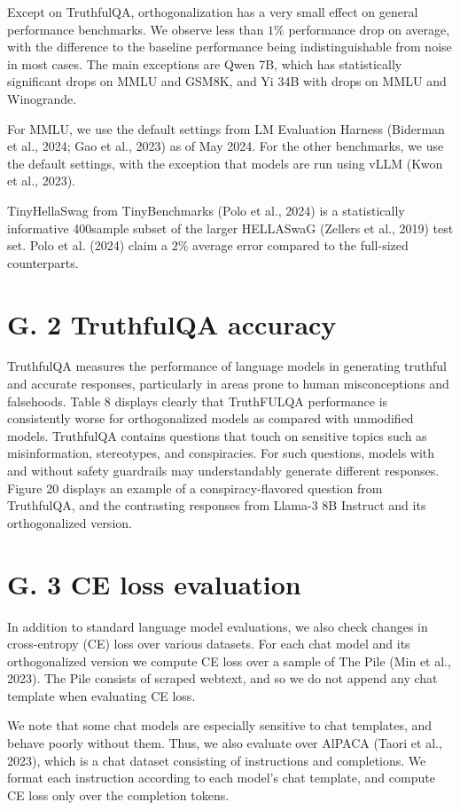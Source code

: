 \documentclass[10pt]{article}
\begin{document}
Except on TruthfulQA, orthogonalization has a very small effect on general performance benchmarks. We observe less than $1 \%$ performance drop on average, with the difference to the baseline performance being indistinguishable from noise in most cases. The main exceptions are Qwen 7B, which has statistically significant drops on MMLU and GSM8K, and Yi 34B with drops on MMLU and Winogrande.

For MMLU, we use the default settings from LM Evaluation Harness (Biderman et al., 2024; Gao et al., 2023) as of May 2024. For the other benchmarks, we use the default settings, with the exception that models are run using vLLM (Kwon et al., 2023).

TinyHellaSwag from TinyBenchmarks (Polo et al., 2024) is a statistically informative 400sample subset of the larger HELLASwaG (Zellers et al., 2019) test set. Polo et al. (2024) claim a $2 \%$ average error compared to the full-sized counterparts.

\section*{G. 2 TruthfulQA accuracy}
TruthfulQA measures the performance of language models in generating truthful and accurate responses, particularly in areas prone to human misconceptions and falsehoods. Table 8 displays clearly that TruthFULQA performance is consistently worse for orthogonalized models as compared with unmodified models. TruthfulQA contains questions that touch on sensitive topics such as misinformation, stereotypes, and conspiracies. For such questions, models with and without safety guardrails may understandably generate different responses. Figure 20 displays an example of a conspiracy-flavored question from TruthfulQA, and the contrasting responses from Llama-3 8B Instruct and its orthogonalized version.

\section*{G. 3 CE loss evaluation}
In addition to standard language model evaluations, we also check changes in cross-entropy (CE) loss over various datasets. For each chat model and its orthogonalized version we compute CE loss over a sample of The Pile (Min et al., 2023). The Pile consists of scraped webtext, and so we do not append any chat template when evaluating CE loss.

We note that some chat models are especially sensitive to chat templates, and behave poorly without them. Thus, we also evaluate over AlPACA (Taori et al., 2023), which is a chat dataset consisting of instructions and completions. We format each instruction according to each model's chat template, and compute CE loss only over the completion tokens.
\end{document}
